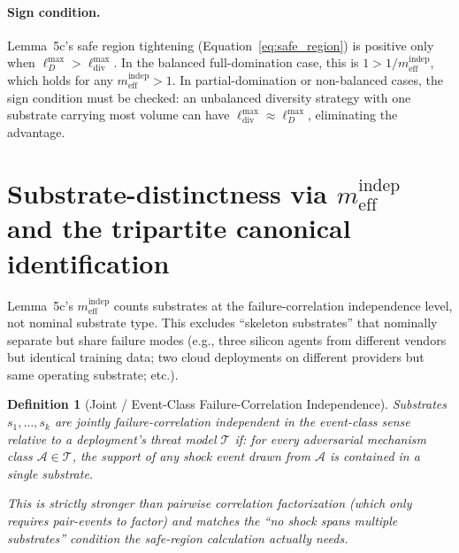 \documentclass{article}
\newtheorem{definition}{Definition}
\newcommand{\mindep}{m_{\mathrm{eff}}^{\mathrm{indep}}}
\newcommand{\lossDmax}{\ell_D^{\max}}
\newcommand{\lossdivmax}{\ell_{\mathrm{div}}^{\max}}
\begin{document}
\paragraph{Sign condition.}
Lemma~5c's safe region tightening
(Equation~\ref{eq:safe_region}) is positive only when
$\lossDmax > \lossdivmax$.  In the balanced full-domination case,
this is $1 > 1/\mindep$, which holds for any $\mindep > 1$.  In
partial-domination or non-balanced cases, the sign condition must be
checked: an unbalanced diversity strategy with one substrate carrying
most volume can have $\lossdivmax \approx \lossDmax$, eliminating the
advantage.

\section{Substrate-distinctness via $\mindep$ and the tripartite
canonical identification}

Lemma~5c's $\mindep$ counts substrates at the failure-correlation
independence level, not nominal substrate type.  This excludes
``skeleton substrates'' that nominally separate but share failure
modes (e.g., three silicon agents from different vendors but
identical training data; two cloud deployments on different providers
but same operating substrate; etc.).

\begin{definition}[Joint / Event-Class Failure-Correlation Independence]
\label{def:indep}
Substrates $s_1, \ldots, s_k$ are \emph{jointly failure-correlation
independent in the event-class sense} relative to a deployment's
threat model $\mathcal{T}$ if: for every adversarial mechanism class
$\mathcal{A} \in \mathcal{T}$, the support of any shock event drawn
from $\mathcal{A}$ is contained in a single substrate.

This is strictly stronger than pairwise correlation factorization
(which only requires pair-events to factor) and matches the
``no shock spans multiple substrates'' condition the safe-region
calculation actually needs.
\end{definition}
\end{document}
